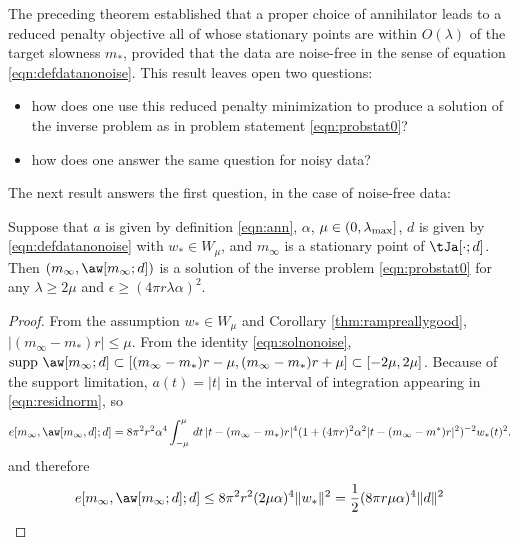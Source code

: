 The preceding theorem established that a proper choice of annihilator
leads to a reduced penalty objective all of whose stationary points
are within $O(\lambda)$ of the target slowness $m_*$, provided that
the data are noise-free in the sense of equation
\ref{eqn:defdatanonoise}. This result leaves open two questions:
\begin{itemize}
\item how does one use this reduced penalty minimization to produce
  a solution of the inverse problem as in problem statement
  \ref{eqn:probstat0}? 
\item how does one answer the same question for noisy data?
\end{itemize}

The next result answers the first question, in the case of noise-free data:
\begin{proposition}
  \label{thm:ipnonoisesuf}
  Suppose that $a$ is given by definition \ref{eqn:ann}, $\alpha$,
  $\mu \in (0,\lambda_{\rm max}]$,
  $d$ is given by
  \ref{eqn:defdatanonoise} with $w_* \in W_{\mu}$, and  $m_{\infty}$ is a stationary
  point of $\tJa[\cdot;d]$. Then $(m_{\infty},\aw[m_{\infty};d])$ is a
  solution of the inverse problem \ref{eqn:probstat0} for any $\lambda
  \ge 2\mu$ and $\epsilon \ge (4\pi r \lambda \alpha)^2$.
\end{proposition}

\begin{proof}
  From the assumption $w_* \in W_{\mu}$ and Corollary
  \ref{thm:rampreallygood}, $|(m_{\infty}-m_*)r|\le \mu$. From the
  identity \ref{eqn:solnonoise},
  $\mbox{supp }\aw[m_{\infty};d] \subset
  [(m_{\infty}-m_*)r-\mu,(m_{\infty}-m_*)r+\mu] \subset
  [-2\mu,2\mu]$. Because of the support limitation, $a(t)=|t|$ in the
  interval of integration appearing in \ref{eqn:residnorm}, so
\[
  e[m_{\infty},\aw[m_{\infty},d];d] 
= 8 \pi^2 r^2 \alpha^4\int^{\mu}_{-\mu}\,dt\,|t-(m_{\infty}-m_*)r|^4(1+(4\pi r)^2 \alpha^2 
|t-(m_{\infty}-m^*)r|^2)^{-2}w_*(t)^2.
\]
and therefore
\begin{equation}
  \label{eqn:estresidnorm}
e[m_{\infty},\aw[m_{\infty};d];d] \le 8 \pi^2 r^2 (2\mu\alpha)^4 \|w_*\|^2 =
\frac{1}{2}(8 \pi r \mu \alpha)^4 \|d\|^2
\end{equation}
\end{proof}

